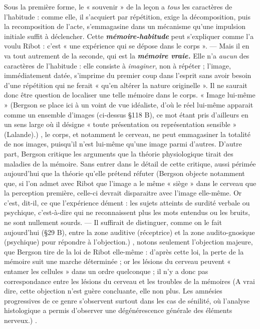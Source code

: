 Sous la première forme, le « souvenir » de la leçon a {\it tous} les caractères
de l'habitude : comme elle, il s’acquiert par répétition, exige la
décomposition, puis la recomposition de l’acte, s’emmagasine dans
un mécanisme qu’une impulsion initiale suffit à déclencher. Cette
\textbf{\textit {mémoire-habitude}} peut s'expliquer comme l’a voulu Ribot : c’est
« une expérience qui se dépose dans le corps ». — Mais il en va tout
autrement de la seconde, qui est la \textbf{\textit {mémoire vraie.}} Elle n'a {\it aucun}
des caractères de l’habitude : elle consiste à {\it imaginer}, non à répéter ;
l’image, immédiatement datée, s’imprime du premier coup dans l’esprit
sans avoir besoin d’une répétition qui ne ferait « qu’en altérer la
nature originelle ». Il ne saurait donc être question de localiser une
telle mémoire dans le corps. « Image lui-même »
{\scriptsize (Bergson se place ici à un voint de vue idéaliste, d'où le réel lui-même apparait
comme un ensemble d'images (ci-dessus \S 118 B), ce mot étant pris d’ailleurs en un
sens large où il désigne « toute présentation ou représentation sensible » (Lalande).)}
, le corps, et notamment
le cerveau, ne peut emmagasiner la totalité de nos images, puisqu'il
n’est lui-même qu’une image parmi d’autres. D’autre part,
Bergson critique les arguments que la théorie physiologique tirait des
maladies de la mémoire. Sans entrer dans le détail de cette critique,
aussi périmée aujourd’hui que la théorie qu’elle prétend réfuter
{\scriptsize (Bergson objecte notamment que, si l’on admet avec Ribot que l’image a le même
« siège » dans le cerveau que la perception première, celle-ci devrait disparaitre avec
l'image elle-même. Or c’est, dit-il, ce que l'expérience dément : les sujets atteints de
surdité verbale ou psychique, c'est-à-dire qui ne reconnaissent plus les mots entendus ou
les bruits, ne sont nullement sourds. — Il suffirait de distinguer, comme on le fait
aujourd'hui (\S 29 B), entre la zone auditive (réceptrice) et la zone audito-gnosique
(psychique) pour répondre à l’objection.)}
,
notons seulement l’objection majeure, que Bergson tire de la loi de
Ribot elle-même : d’après cette loi, la perte de la mémoire suit une
marche déterminée ; or les lésions du cerveau peuvent « entamer les
cellules » dans un ordre quelconque ; il n’y a donc pas correspondance
entre les lésions du cerveau et les troubles de la mémoires
{\scriptsize (A vrai dire, cette objection n'est guère concluante, elle non plus. Les amnésies
progressives de ce genre s’observent surtout dans les cas de sénilité, où l'analyse
histologique a permis d'observer une dégénérescence générale des éléments nerveux.)}
.

